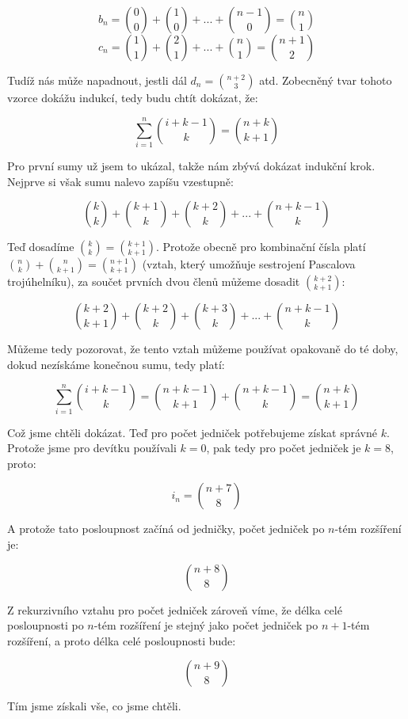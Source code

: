 \documentclass{fkssolpub}
\begin{document}
\[
  b_n = \binom{0}{0} + \binom{1}{0} + ... + \binom{n - 1}{0} = \binom{n}{1}
\]
\[
  c_n = \binom{1}{1} + \binom{2}{1} + ... + \binom{n}{1} = \binom{n + 1}{2}
\]

Tudíž nás může napadnout, jestli dál $d_n = \binom{n + 2}{3}$ atd. Zobecněný
tvar tohoto vzorce dokážu indukcí, tedy budu chtít dokázat, že:

\[
  \sum_{i=1}^n \binom{i + k - 1}{k} = \binom{n + k}{k + 1}
\]

Pro první sumy už jsem to ukázal, takže nám zbývá dokázat indukční krok.
Nejprve si však sumu nalevo zapíšu vzestupně:

\[
  \binom{k}{k} + \binom{k + 1}{k} + \binom{k + 2}{k} + ... + \binom{n + k - 1}{k}
\]

Teď dosadíme $\binom{k}{k} = \binom{k + 1}{k + 1}$. Protože obecně pro
kombinační čísla platí $\binom{n}{k} + \binom{n}{k + 1} = \binom{n + 1}{k + 1}$
(vztah, který umožňuje sestrojení Pascalova trojúhelníku), za součet prvních
dvou členů můžeme dosadit $\binom{k + 2}{k + 1}$:

\[
  \binom{k + 2}{k + 1} + \binom{k + 2}{k} + \binom{k + 3}{k} + ... + \binom{n + k - 1}{k}
\]

Můžeme tedy pozorovat, že tento vztah můžeme používat opakovaně do té
doby, dokud nezískáme konečnou sumu, tedy platí:

\[
  \sum_{i=1}^n \binom{i + k - 1}{k} = \binom{n + k - 1}{k + 1} + \binom{n + k - 1}{k}
    = \binom{n + k}{k + 1}
\]

Což jsme chtěli dokázat. Teď pro počet jedniček potřebujeme získat správné
$k$. Protože jsme pro devítku používali $k = 0$, pak tedy pro počet jedniček
je $k = 8$, proto:

\[
  i_n = \binom{n + 7}{8}
\]

A protože tato posloupnost začíná od jedničky, počet jedniček po $n$-tém
rozšíření je:

\[
  \binom{n + 8}{8}
\]

Z rekurzivního vztahu pro počet jedniček zároveň víme, že délka celé
posloupnosti po $n$-tém rozšíření je stejný jako počet jedniček
po $n + 1$-tém rozšíření, a proto délka celé posloupnosti bude:

\[
  \binom{n + 9}{8}
\]

Tím jsme získali vše, co jsme chtěli.
\end{document}
